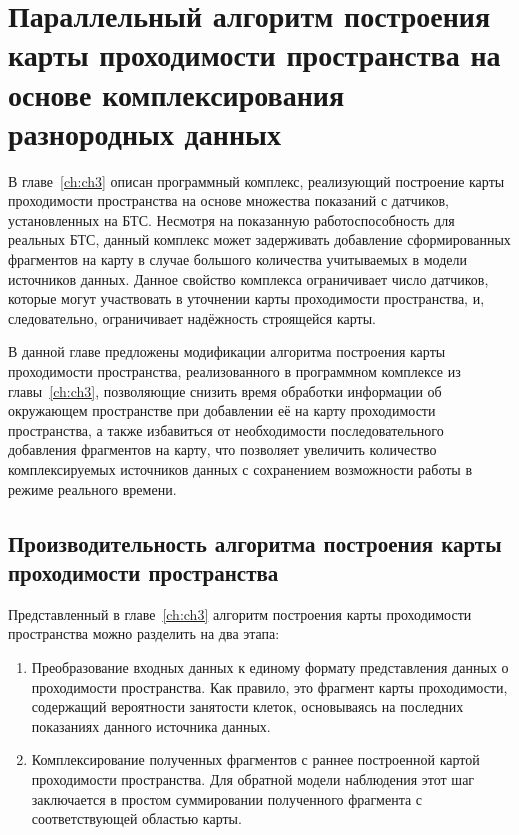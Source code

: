 \chapter{Параллельный алгоритм построения карты проходимости пространства на основе комплексирования разнородных данных}\label{ch:ch4}

В главе~\cref{ch:ch3} описан программный комплекс, реализующий построение карты проходимости пространства на основе множества показаний с датчиков, установленных на БТС. Несмотря на показанную работоспособность для реальных БТС, данный комплекс может задерживать добавление сформированных фрагментов на карту в случае большого количества учитываемых в модели источников данных. Данное свойство комплекса ограничивает число датчиков, которые могут участвовать в уточнении карты проходимости пространства, и, следовательно, ограничивает надёжность строящейся карты.

В данной главе предложены модификации алгоритма построения карты проходимости пространства, реализованного в программном комплексе из главы~\cref{ch:ch3}, позволяющие снизить время обработки информации об окружающем пространстве при добавлении её на карту проходимости пространства, а также избавиться от необходимости последовательного добавления фрагментов на карту, что позволяет увеличить количество комплексируемых источников данных с сохранением возможности работы в режиме реального времени.

\section{Производительность алгоритма построения карты проходимости пространства}\label{sec:ch4/perf}

Представленный в главе~\cref{ch:ch3} алгоритм построения карты проходимости пространства можно разделить на два этапа:

\begin{enumerate}
	\item Преобразование входных данных к единому формату представления данных о проходимости пространства. Как правило, это фрагмент карты проходимости, содержащий вероятности занятости клеток, основываясь на последних показаниях данного источника данных.
	\item Комплексирование полученных фрагментов с раннее построенной картой проходимости пространства. Для обратной модели наблюдения этот шаг заключается в простом суммировании полученного фрагмента с соответствующей областью карты.
\end{enumerate}

